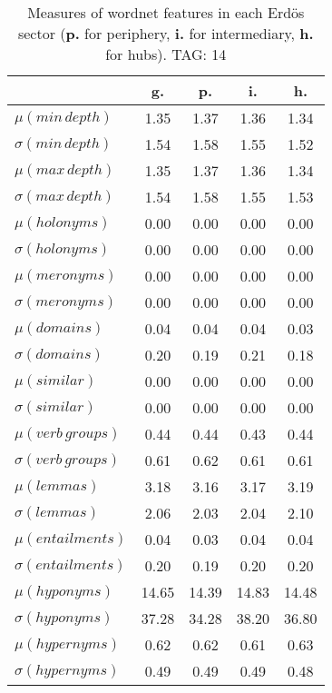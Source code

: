 \begin{table}[h!]
\begin{center}
\begin{tabular}{| l | c | c | c | c |}\hline
 & g. & p. & i. & h. \\\hline
$\mu(min\,depth)$ & 1.35  & 1.37  & 1.36  & 1.34 \\\hline
$\sigma(min\,depth)$ & 1.54  & 1.58  & 1.55  & 1.52 \\\hline
$\mu(max\,depth)$ & 1.35  & 1.37  & 1.36  & 1.34 \\\hline
$\sigma(max\,depth)$ & 1.54  & 1.58  & 1.55  & 1.53 \\\hline
$\mu(holonyms)$ & 0.00  & 0.00  & 0.00  & 0.00 \\\hline
$\sigma(holonyms)$ & 0.00  & 0.00  & 0.00  & 0.00 \\\hline
$\mu(meronyms)$ & 0.00  & 0.00  & 0.00  & 0.00 \\\hline
$\sigma(meronyms)$ & 0.00  & 0.00  & 0.00  & 0.00 \\\hline
$\mu(domains)$ & 0.04  & 0.04  & 0.04  & 0.03 \\\hline
$\sigma(domains)$ & 0.20  & 0.19  & 0.21  & 0.18 \\\hline
$\mu(similar)$ & 0.00  & 0.00  & 0.00  & 0.00 \\\hline
$\sigma(similar)$ & 0.00  & 0.00  & 0.00  & 0.00 \\\hline
$\mu(verb\,groups)$ & 0.44  & 0.44  & 0.43  & 0.44 \\\hline
$\sigma(verb\,groups)$ & 0.61  & 0.62  & 0.61  & 0.61 \\\hline
$\mu(lemmas)$ & 3.18  & 3.16  & 3.17  & 3.19 \\\hline
$\sigma(lemmas)$ & 2.06  & 2.03  & 2.04  & 2.10 \\\hline
$\mu(entailments)$ & 0.04  & 0.03  & 0.04  & 0.04 \\\hline
$\sigma(entailments)$ & 0.20  & 0.19  & 0.20  & 0.20 \\\hline
$\mu(hyponyms)$ & 14.65  & 14.39  & 14.83  & 14.48 \\\hline
$\sigma(hyponyms)$ & 37.28  & 34.28  & 38.20  & 36.80 \\\hline
$\mu(hypernyms)$ & 0.62  & 0.62  & 0.61  & 0.63 \\\hline
$\sigma(hypernyms)$ & 0.49  & 0.49  & 0.49  & 0.48 \\\hline
\end{tabular}
\caption{Measures of wordnet features in each Erd\"os sector ({{\bf p.}} for periphery, {{\bf i.}} for intermediary, {{\bf h.}} for hubs). TAG: 14}
\end{center}
\end{table}